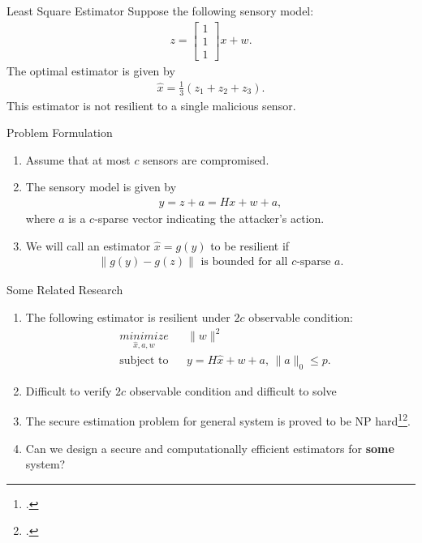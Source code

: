 \documentclass[10pt]{beamer}
\begin{document}
\begin{frame}{Least Square Estimator}
  Suppose the following sensory model:
  \begin{align*}
    z = \begin{bmatrix}
      1\\
      1\\
      1
    \end{bmatrix}x + w.
  \end{align*}
  The optimal estimator is given by
  \begin{align*}
    \hat x = \frac{1}{3}\left(z_1+z_2+z_3\right).
  \end{align*}
  This estimator is not resilient to a single malicious sensor.
\end{frame}

\begin{frame}{Problem Formulation}
  \begin{enumerate}
    \item Assume that at most $c$ sensors are compromised.
    \item The sensory model is given by
      \begin{align*}
	y = z + a = Hx + w +a,
      \end{align*}
      where $a$ is a $c$-sparse vector indicating the attacker's action.
    \item We will call an estimator $\hat x = g(y)$ to be resilient if
      \begin{align*}
	\|g(y) - g(z)\|\text{ is bounded for all $c$-sparse $a$}.
      \end{align*}
  \end{enumerate}
\end{frame}

\begin{frame}{Some Related Research}
  \begin{enumerate}
  \item The following estimator is resilient under $2c$ observable condition:
    \begin{align*}
      & \mathop{\textit{minimize}}\limits_{\hat x,a,w}&
      & \|w\|^2 \\
      &\text{subject to}&
      &y = H \hat x + w + a,\,\|a\|_0\leq p.
    \end{align*}
  \item Difficult to verify $2c$ observable condition and difficult to solve
\item The secure estimation problem for general system is proved to be NP hard\footcite{Hendrickx2014}\footcite{Mao2019}.
  \item Can we design a secure and computationally efficient estimators for {\bf some} system?
  \end{enumerate}
\end{frame}
\end{document}
